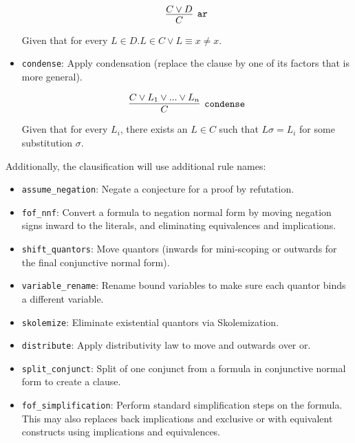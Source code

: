 \documentclass[a4paper, 11pt]{article}
\begin{document}
\begin{itemize}
  \[
  \infer[\mathtt{ar}]{C}{C \vee D}
  \]

  Given that for every $L \in D. L \in C \vee L \equiv x \neq x$.

\item \texttt{condense}:
  Apply condensation (replace the clause by one of its factors that is more
  general).

  \[
  \infer[\mathtt{condense}]{C}{C \vee L_1 \vee ... \vee L_n}
  \]

  Given that for every $L_i$, there exists an $L \in C$ such that $L\sigma =
  L_i$ for some substitution $\sigma$.

\end{itemize}

Additionally, the clausification will use additional rule names:

\begin{itemize}
\item \texttt{assume\_negation}:
  Negate a conjecture for a proof by refutation. 

\item \texttt{fof\_nnf}:
  Convert a formula to negation normal form by moving negation signs inward to
  the literals, and eliminating equivalences and implications.

\item \texttt{shift\_quantors}:
  Move quantors (inwards for mini-scoping or outwards for the final conjunctive
  normal form).

\item \texttt{variable\_rename}:
  Rename bound variables to make sure each quantor binds a different variable.

\item \texttt{skolemize}:
  Eliminate existential quantors via Skolemization. 

\item \texttt{distribute}:
  Apply distributivity law to move and outwards over or.

\item \texttt{split\_conjunct}:
  Split of one conjunct from a formula in conjunctive normal form to create a
  clause.

\item \texttt{fof\_simplification}:
  Perform standard simplification steps on the formula. This may also replaces
  back implications and exclusive or with equivalent constructs using
  implications and equivalences.

\end{itemize}
\end{document}
